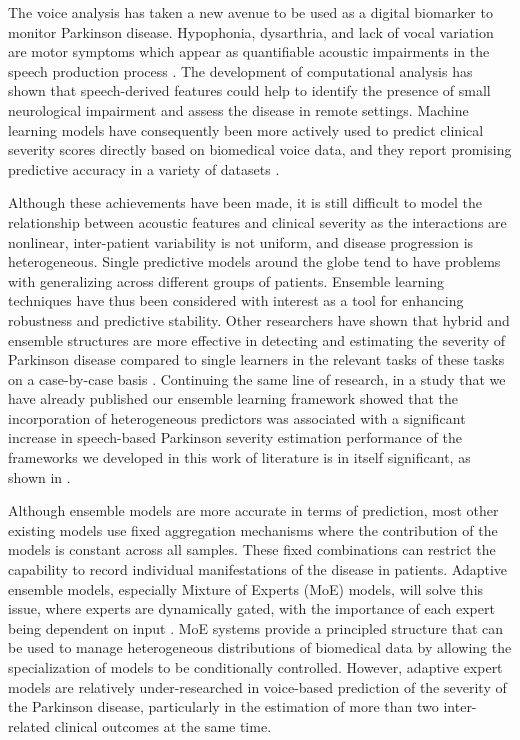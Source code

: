 \documentclass{customIEEEsingle}
\begin{document}
	The voice analysis has taken a new avenue to be used as a digital biomarker to monitor Parkinson disease. Hypophonia, dysarthria, and lack of vocal variation are motor symptoms which appear as quantifiable acoustic impairments in the speech production process \cite{little-2007, little-2008}. The development of computational analysis has shown that speech-derived features could help to identify the presence of small neurological impairment and assess the disease in remote settings. Machine learning models have consequently been more actively used to predict clinical severity scores directly based on biomedical voice data, and they report promising predictive accuracy in a variety of datasets \cite{tsanas-2009,shastry-2023,nilashi-2022,neto-2024}. 
	
	Although these achievements have been made, it is still difficult to model the relationship between acoustic features and clinical severity as the interactions are nonlinear, inter-patient variability is not uniform, and disease progression is heterogeneous. Single predictive models around the globe tend to have problems with generalizing across different groups of patients. Ensemble learning techniques have thus been considered with interest as a tool for enhancing robustness and predictive stability. Other researchers have shown that hybrid and ensemble structures are more effective in detecting and estimating the severity of Parkinson disease compared to single learners in the relevant tasks of these tasks on a case-by-case basis \cite{sheikhi-2022, motamedi-2025, khedimi-2025}. Continuing the same line of research, in a study that we have already published our ensemble learning framework showed that the incorporation of heterogeneous predictors was associated with a significant increase in speech-based Parkinson severity estimation performance of the frameworks we developed in this work of literature is in itself significant, as shown in \cite{dasgupta-2025}. 
	
	Although ensemble models are more accurate in terms of prediction, most other existing models use fixed aggregation mechanisms where the contribution of the models is constant across all samples. These fixed combinations can restrict the capability to record individual manifestations of the disease in patients. Adaptive ensemble models, especially Mixture of Experts (MoE) models, will solve this issue, where experts are dynamically gated, with the importance of each expert being dependent on input \cite{khalili-2013, raza-2025}. MoE systems provide a principled structure that can be used to manage heterogeneous distributions of biomedical data by allowing the specialization of models to be conditionally controlled. However, adaptive expert models are relatively under-researched in voice-based prediction of the severity of the Parkinson disease, particularly in the estimation of more than two inter-related clinical outcomes at the same time. 
	
\end{document}
